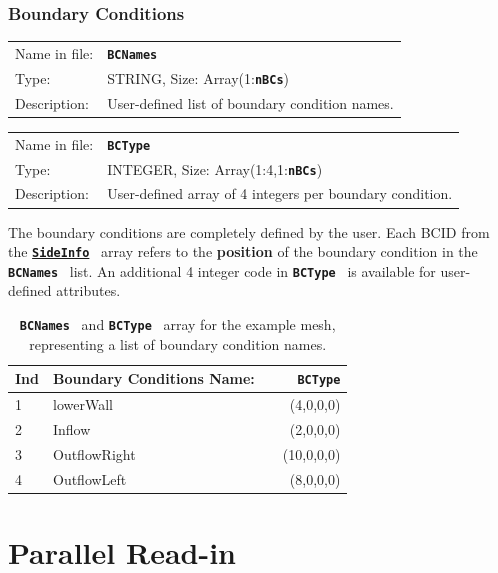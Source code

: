 \documentclass[a4paper,headsepline]{scrreprt}
\newcommand\ttbf[1]{\textbf{\texttt{#1}}}
\newcommand\SideInfo{\hyperlink{SideInfo}{\ttbf{SideInfo}}}
\newcommand\BCNames{\ttbf{BCNames}}
\newcommand\BCType{\ttbf{BCType}}
\newcommand\nBCs{\ttbf{nBCs}}
\begin{document}
\newpage

\subsection{Boundary Conditions}

\begin{tabularx}{1.0\textwidth}{lX}
Name in file: & \BCNames \\
Type:         & STRING, \quad Size: Array(1:\nBCs)  \\
Description:  & User-defined list of boundary condition names. \\
\end{tabularx}

\begin{tabularx}{1.0\textwidth}{lX}
Name in file: & \BCType \\
Type:         & INTEGER, \quad Size: Array(1:4,1:\nBCs)  \\
Description:  & User-defined array of 4 integers per boundary condition. \\
\end{tabularx}

The boundary conditions are completely defined by the user. Each BCID from the \SideInfo~ array refers to the \textbf{position} of the boundary condition in the \BCNames~ list. An additional 4 integer code in \BCType~ is available for user-defined attributes.

\begin{table}[h!]
\centering
\begin{tabular}{|l|l|c|r|} \hline
Ind & Boundary Conditions Name: & & \BCType \\ \hline
1   &  lowerWall    & & (4,0,0,0) \\
2   &  Inflow       & & (2,0,0,0) \\
3   &  OutflowRight & & (10,0,0,0) \\
4   &  OutflowLeft  & & (8,0,0,0) \\ \hline
\end{tabular}
\caption{\BCNames~ and \BCType~ array for the example mesh, representing a list of boundary condition names.}
\end{table}


\chapter{Parallel Read-in}
\end{document}
